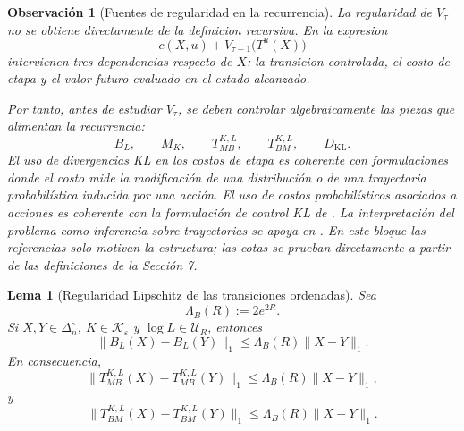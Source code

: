 \documentclass[12pt]{article}
\newtheorem{lema}{Lema}[section]
\newtheorem{observacion}{Observación}[section]
\begin{document}
\begin{observacion}[Fuentes de regularidad en la recurrencia]\label{obs:fuentes_regularidad_bellman}
La regularidad de \(V_\tau\) no se obtiene directamente de la definicion recursiva. En la expresion
\[
c(X,u)+V_{\tau-1}\bigl(T^u(X)\bigr)
\]
intervienen tres dependencias respecto de \(X\): la transicion controlada, el costo de etapa y el valor futuro evaluado en el estado alcanzado.

Por tanto, antes de estudiar \(V_\tau\), se deben controlar algebraicamente las piezas que alimentan la recurrencia:
\[
B_L,\qquad
M_K,\qquad
T_{MB}^{K,L},\qquad
T_{BM}^{K,L},
\qquad
D_{\mathrm{KL}}.
\]
El uso de divergencias KL en los costos de etapa es coherente con formulaciones donde el costo mide la modificación de una distribución o de una trayectoria probabilística inducida por una acción. El uso de costos probabilísticos asociados a acciones es coherente con la formulación de control KL de \citep{Todorov2009EfficientComputationOptimalActions}. La interpretación del problema como inferencia sobre trayectorias se apoya en \citep{KappenGomezOpper2012OptimalControlAsAGraphicalModelInferenceProblem}. En este bloque las referencias solo motivan la estructura; las cotas se prueban directamente a partir de las definiciones de la Sección 7.
\end{observacion}

\begin{lema}[Regularidad Lipschitz de las transiciones ordenadas]\label{lem:lipschitz_transiciones_ordenadas}
Sea
\[
\Lambda_B(R):=2e^{2R}.
\]
Si \(X,Y\in\Delta_n^\circ\), \(K\in\mathcal K_\varepsilon\) y \(\log L\in\mathcal U_R\), entonces
\[
\|B_L(X)-B_L(Y)\|_1
\le
\Lambda_B(R)\|X-Y\|_1.
\]
En consecuencia,
\[
\|T_{MB}^{K,L}(X)-T_{MB}^{K,L}(Y)\|_1
\le
\Lambda_B(R)\|X-Y\|_1,
\]
y
\[
\|T_{BM}^{K,L}(X)-T_{BM}^{K,L}(Y)\|_1
\le
\Lambda_B(R)\|X-Y\|_1.
\]
\end{lema}
\end{document}
